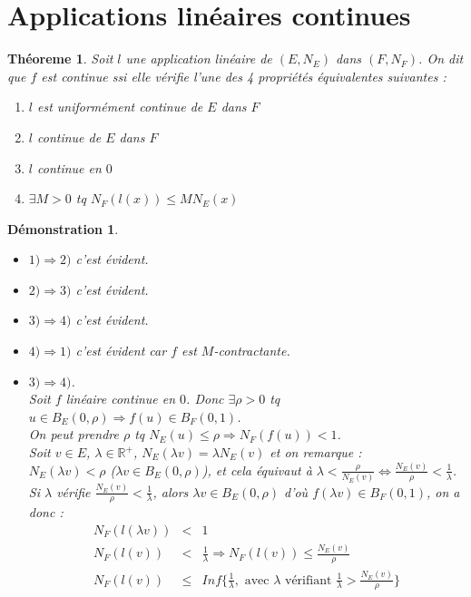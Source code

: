 \documentclass[a4paper, oneside]{report}
\theoremstyle{break}
\newtheorem{thm}{Théoreme}[section] %
\newtheorem*{demo}{Démonstration}
\newcommand{\R}{\mathbb{R}}
\newcommand{\unifcont}{uniformément continue }
\newcommand{\fracun}[1]{\frac{1}{#1}}
\begin{document}
\section{Applications linéaires continues}

\begin{thm}
Soit $l$ une application linéaire de $(E,N_E)$ dans $(F,N_F)$.
On dit que $f$ est continue ssi elle vérifie l'une des 4 propriétés équivalentes suivantes :
\begin{enumerate}
\item $l$ est \unifcont de $E$ dans $F$
\item $l$ continue de $E$ dans $F$
\item $l$ continue en $0$
\item $\exists M >0$ tq $N_F(l(x))\leq MN_E(x)$
\end{enumerate}

\end{thm}

\begin{demo}
\begin{itemize}
\item $1) \Rightarrow 2)$ c'est évident.
\item $2) \Rightarrow 3)$ c'est évident.
\item $3) \Rightarrow 4)$ c'est évident.
\item $4) \Rightarrow 1)$ c'est évident car $f$ est $M$-contractante.
\item $3) \Rightarrow 4)$.\\
Soit $f$ linéaire continue en $0$. Donc $\exists \rho > 0$ tq $u\in B_E(0,\rho)\Rightarrow f(u)\in B_F(0,1)$.\\
On peut prendre $\rho$ tq $N_E(u)\leq \rho \Rightarrow N_F(f(u))<1$.\\
Soit $v\in E$, $\lambda\in \R^+$, $N_E(\lambda v)=\lambda N_E(v)$ et on remarque :\\
$N_E(\lambda v)<\rho$ ($\lambda v \in B_E(0,\rho)$), et cela équivaut à $\lambda < \frac{\rho}{N_E(v)} \Leftrightarrow \frac{N_E(v)}{\rho}<\fracun{\lambda}$.\\
Si $\lambda$ vérifie $\frac{N_E(v)}{\rho}<\fracun{\lambda}$, alors $\lambda v\in B_E(0,\rho)$ d'où $f(\lambda v)\in B_F(0,1)$, on a donc :
$$\begin{array}{lll}
N_F(l(\lambda v))&<& 1\\
N_F(l(v))&<&\fracun{\lambda}\Rightarrow N_F(l(v))\leq \frac{N_E(v)}{\rho}\\
N_F(l(v)) &\leq& Inf\{\fracun{\lambda},\text{ avec }\lambda \text{ vérifiant } \fracun{\lambda}>\frac{N_E(v)}{\rho} \}
\end{array}$$
\end{itemize}
\end{demo}
\end{document}
